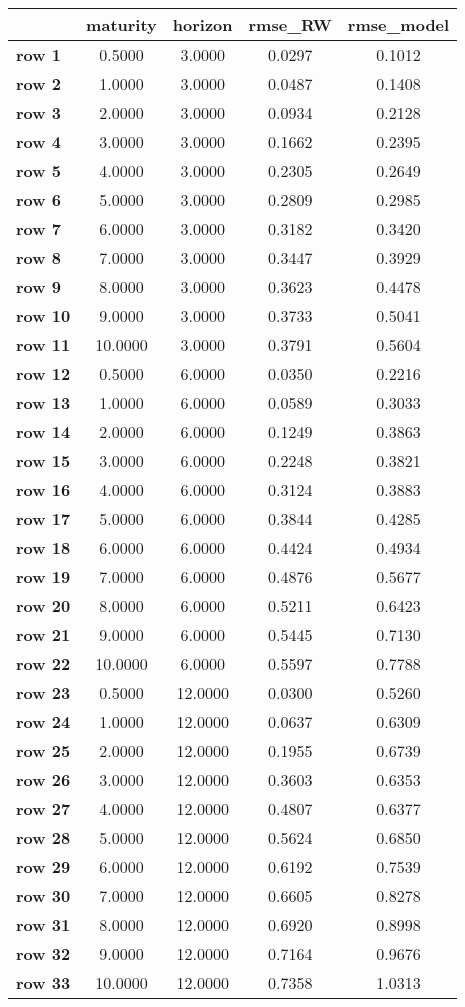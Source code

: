 \begin{tiny}\begin{tabular}{|l|c|c|c|c|}
\hline
&\textbf{maturity}&\textbf{horizon}&\textbf{rmse_RW}&\textbf{rmse_model}\\\hline
\textbf{row 1}&0.5000&3.0000&0.0297&0.1012\\\hline
\textbf{row 2}&1.0000&3.0000&0.0487&0.1408\\\hline
\textbf{row 3}&2.0000&3.0000&0.0934&0.2128\\\hline
\textbf{row 4}&3.0000&3.0000&0.1662&0.2395\\\hline
\textbf{row 5}&4.0000&3.0000&0.2305&0.2649\\\hline
\textbf{row 6}&5.0000&3.0000&0.2809&0.2985\\\hline
\textbf{row 7}&6.0000&3.0000&0.3182&0.3420\\\hline
\textbf{row 8}&7.0000&3.0000&0.3447&0.3929\\\hline
\textbf{row 9}&8.0000&3.0000&0.3623&0.4478\\\hline
\textbf{row 10}&9.0000&3.0000&0.3733&0.5041\\\hline
\textbf{row 11}&10.0000&3.0000&0.3791&0.5604\\\hline
\textbf{row 12}&0.5000&6.0000&0.0350&0.2216\\\hline
\textbf{row 13}&1.0000&6.0000&0.0589&0.3033\\\hline
\textbf{row 14}&2.0000&6.0000&0.1249&0.3863\\\hline
\textbf{row 15}&3.0000&6.0000&0.2248&0.3821\\\hline
\textbf{row 16}&4.0000&6.0000&0.3124&0.3883\\\hline
\textbf{row 17}&5.0000&6.0000&0.3844&0.4285\\\hline
\textbf{row 18}&6.0000&6.0000&0.4424&0.4934\\\hline
\textbf{row 19}&7.0000&6.0000&0.4876&0.5677\\\hline
\textbf{row 20}&8.0000&6.0000&0.5211&0.6423\\\hline
\textbf{row 21}&9.0000&6.0000&0.5445&0.7130\\\hline
\textbf{row 22}&10.0000&6.0000&0.5597&0.7788\\\hline
\textbf{row 23}&0.5000&12.0000&0.0300&0.5260\\\hline
\textbf{row 24}&1.0000&12.0000&0.0637&0.6309\\\hline
\textbf{row 25}&2.0000&12.0000&0.1955&0.6739\\\hline
\textbf{row 26}&3.0000&12.0000&0.3603&0.6353\\\hline
\textbf{row 27}&4.0000&12.0000&0.4807&0.6377\\\hline
\textbf{row 28}&5.0000&12.0000&0.5624&0.6850\\\hline
\textbf{row 29}&6.0000&12.0000&0.6192&0.7539\\\hline
\textbf{row 30}&7.0000&12.0000&0.6605&0.8278\\\hline
\textbf{row 31}&8.0000&12.0000&0.6920&0.8998\\\hline
\textbf{row 32}&9.0000&12.0000&0.7164&0.9676\\\hline
\textbf{row 33}&10.0000&12.0000&0.7358&1.0313\\\hline
\end{tabular}
\end{tiny}
